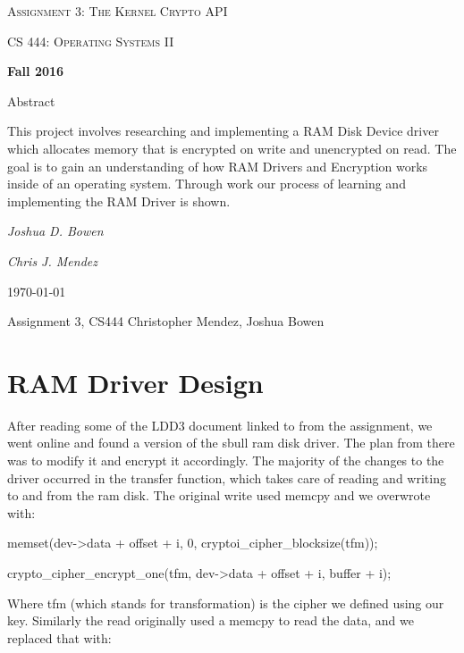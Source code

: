 \documentclass[letterpaper,10pt,titlepage]{article}
\begin{document}
\begin{titlepage}
	\centering
	\vspace*{4cm}
	{\scshape\huge Assignment 3: The Kernel Crypto API\par}
	\vspace{1cm}
	{\scshape\LARGE CS 444: Operating Systems II\par}
	\vspace{0.5cm}
	{\large\bfseries Fall 2016\par}
	{\large Abstract\par}
	\vspace {0.5cm}
		This project involves researching and implementing a RAM Disk Device driver which allocates memory that is encrypted on write and unencrypted on read. The goal is to gain an understanding of how RAM Drivers and Encryption works inside of an operating system. Through work our process of learning and implementing the RAM Driver is shown.
	\par
	\vspace{1cm}
	{\Large\itshape Joshua D. Bowen\par}
	{\Large\itshape Chris J. Mendez\par}
	\vfill
	{\large \today\par}	

\end{titlepage}

Assignment 3, CS444
Christopher Mendez, Joshua Bowen



\section{RAM Driver Design}

After reading some of the LDD3 document linked to from the assignment, we went online and found a version of the sbull ram disk driver.
The plan from there was to modify it and encrypt it accordingly.
The majority of the changes to the driver occurred in the transfer function, which takes care of reading and writing to and from the ram disk.
The original write used memcpy and we overwrote with:

memset(dev->data + offset + i, 0, cryptoi\_cipher\_blocksize(tfm));

crypto\_cipher\_encrypt\_one(tfm, dev->data + offset + i, buffer + i);

Where tfm (which stands for transformation) is the cipher we defined using our key. Similarly the read originally used a memcpy to read the data, and we replaced that with:
\end{document}
